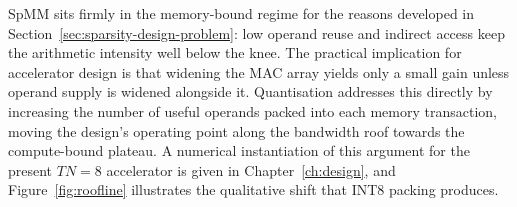 SpMM sits firmly in the memory-bound regime for the reasons developed in
Section~\ref{sec:sparsity-design-problem}: low operand reuse and indirect access keep the arithmetic
intensity well below the knee. The practical implication for accelerator
design is that widening the MAC array yields only a small gain unless
operand supply is widened alongside it. Quantisation addresses this
directly by increasing the number of useful operands packed into each
memory transaction, moving the design's operating point along the
bandwidth roof towards the compute-bound plateau. A numerical
instantiation of this argument for the present $TN = 8$ accelerator is
given in Chapter~\ref{ch:design}, and Figure~\ref{fig:roofline}
illustrates the qualitative shift that INT8 packing produces.
